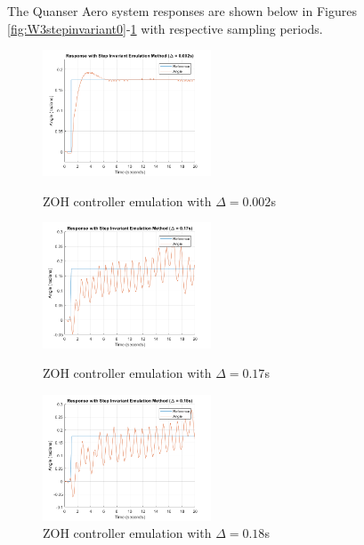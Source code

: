 \documentclass[11pt]{article}
\begin{document}
The Quanser Aero system responses are shown below in Figures \ref{fig:W3stepinvariant0}-\ref{fig:W3stepinvariant2} with respective sampling periods.

\begin{figure}[H]
\begin{minipage}{.3\textwidth}
    \centering
    \includegraphics[width=5cm]{plots/StepInvariant.png}
    \caption{\small{ZOH controller emulation with $\Delta = 0.002$s}}
    \label{fig:W3stepinvariant0}
\end{minipage}
\hspace{0.5cm}
\begin{minipage}{.3\textwidth}
    \centering
    \includegraphics[width=5cm]{plots/StepInvariant_0_17.png}
    \caption{\small{ZOH controller emulation with $\Delta = 0.17$s}}
    \label{fig:W3stepinvariant1}
\end{minipage}
\hspace{0.5cm}
\begin{minipage}{.3\textwidth}
    \centering
    \includegraphics[width=5cm]{plots/StepInvariant_0_18.png}
    \caption{\small{ZOH controller emulation with $\Delta = 0.18$s}}
    \label{fig:W3stepinvariant2}
\end{minipage}
\end{figure}
\end{document}
